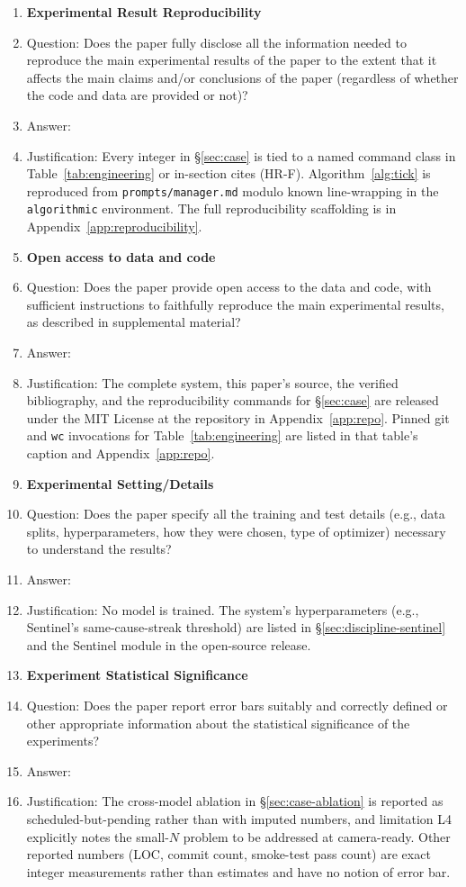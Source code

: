\begin{enumerate}
\item {\bf Experimental Result Reproducibility}
    \item[] Question: Does the paper fully disclose all the information needed to reproduce the main experimental results of the paper to the extent that it affects the main claims and/or conclusions of the paper (regardless of whether the code and data are provided or not)?
    \item[] Answer: \answerYes{}
    \item[] Justification: Every integer in \S\ref{sec:case} is tied to a named command class in Table~\ref{tab:engineering} or in-section cites (HR-F). Algorithm~\ref{alg:tick} is reproduced from \texttt{prompts/manager.md} modulo known line-wrapping in the \texttt{algorithmic} environment. The full reproducibility scaffolding is in Appendix~\ref{app:reproducibility}.

\item {\bf Open access to data and code}
    \item[] Question: Does the paper provide open access to the data and code, with sufficient instructions to faithfully reproduce the main experimental results, as described in supplemental material?
    \item[] Answer: \answerYes{}
    \item[] Justification: The complete system, this paper's source, the verified bibliography, and the reproducibility commands for \S\ref{sec:case} are released under the MIT License at the repository in Appendix~\ref{app:repo}. Pinned git and \texttt{wc} invocations for Table~\ref{tab:engineering} are listed in that table's caption and Appendix~\ref{app:repo}.

\item {\bf Experimental Setting/Details}
    \item[] Question: Does the paper specify all the training and test details (e.g., data splits, hyperparameters, how they were chosen, type of optimizer) necessary to understand the results?
    \item[] Answer: \answerNA{}
    \item[] Justification: No model is trained. The system's hyperparameters (e.g., Sentinel's same-cause-streak threshold) are listed in \S\ref{sec:discipline-sentinel} and the Sentinel module in the open-source release.

\item {\bf Experiment Statistical Significance}
    \item[] Question: Does the paper report error bars suitably and correctly defined or other appropriate information about the statistical significance of the experiments?
    \item[] Answer: \answerNo{}
    \item[] Justification: The cross-model ablation in \S\ref{sec:case-ablation} is reported as scheduled-but-pending rather than with imputed numbers, and limitation L4 explicitly notes the small-$N$ problem to be addressed at camera-ready. Other reported numbers (LOC, commit count, smoke-test pass count) are exact integer measurements rather than estimates and have no notion of error bar.


\end{enumerate}
